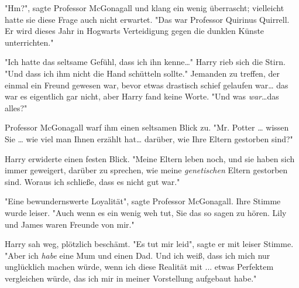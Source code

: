 "Hm?", sagte Professor McGonagall und klang ein wenig überrascht; vielleicht hatte sie diese Frage auch nicht erwartet. "Das war Professor Quirinus Quirrell. Er wird dieses Jahr in Hogwarts Verteidigung gegen die dunklen Künste unterrichten."

"Ich hatte das seltsame Gefühl, dass ich ihn kenne…" Harry rieb sich die Stirn. "Und dass ich ihm nicht die Hand schütteln sollte." Jemanden zu treffen, der einmal ein Freund gewesen war, bevor etwas drastisch schief gelaufen war… das war es eigentlich gar nicht, aber Harry fand keine Worte. "Und was \emph{war}…das alles?" 

Professor McGonagall warf ihm einen seltsamen Blick zu. "Mr. Potter … wissen Sie … wie viel man Ihnen erzählt hat… darüber, wie Ihre Eltern gestorben sind?" 

Harry erwiderte einen festen Blick. "Meine Eltern leben noch, und sie haben sich immer geweigert, darüber zu sprechen, wie meine \emph{genetischen} Eltern gestorben sind. Woraus ich schließe, dass es nicht gut war." 

"Eine bewundernswerte Loyalität", sagte Professor McGonagall. Ihre Stimme wurde leiser. "Auch wenn es ein wenig weh tut, Sie das so sagen zu hören. Lily und James waren Freunde von mir." 

Harry sah weg, plötzlich beschämt. "Es tut mir leid", sagte er mit leiser Stimme. "Aber ich \emph{habe} eine Mum und einen Dad. Und ich weiß, dass ich mich nur unglücklich machen würde, wenn ich diese Realität mit ... etwas Perfektem vergleichen würde, das ich mir in meiner Vorstellung aufgebaut habe." 

